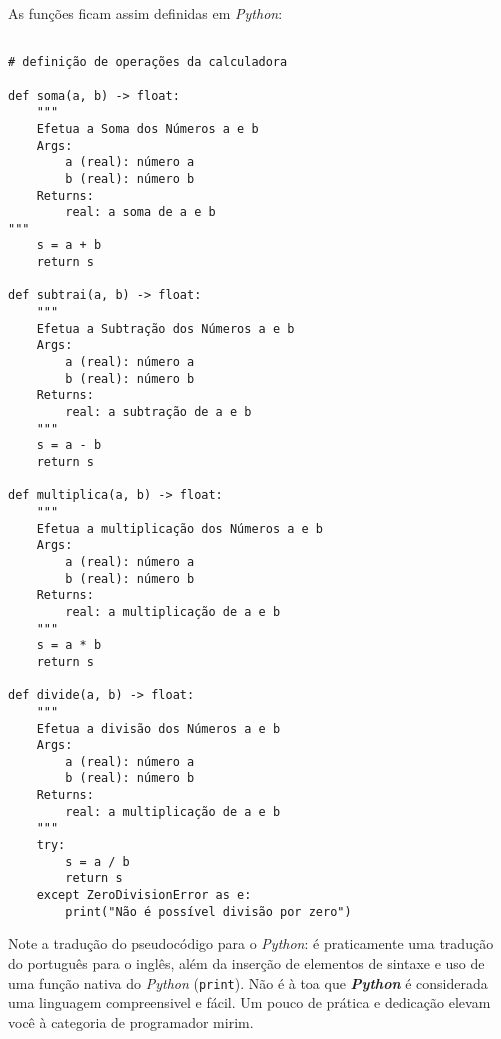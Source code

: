 \documentclass[a4paper, 12pt, onecolumn,singlespacing]{article}
\begin{document}
As funções ficam assim definidas em \textit{Python}:
\begin{verbatim}

# definição de operações da calculadora

def soma(a, b) -> float:
	"""
	Efetua a Soma dos Números a e b
	Args:
		a (real): número a
		b (real): número b
	Returns:
		real: a soma de a e b
"""
	s = a + b
	return s

def subtrai(a, b) -> float:
	"""
	Efetua a Subtração dos Números a e b
	Args:
		a (real): número a
		b (real): número b
	Returns:
		real: a subtração de a e b
	"""
	s = a - b
	return s

def multiplica(a, b) -> float:
	"""
	Efetua a multiplicação dos Números a e b
	Args:
		a (real): número a
		b (real): número b
	Returns:
		real: a multiplicação de a e b
	"""
	s = a * b
	return s

def divide(a, b) -> float:
	"""
	Efetua a divisão dos Números a e b
	Args:
		a (real): número a
		b (real): número b
	Returns:
		real: a multiplicação de a e b
	"""
	try:
		s = a / b
		return s
	except ZeroDivisionError as e:
		print("Não é possível divisão por zero")

\end{verbatim}

Note a tradução do pseudocódigo para o \textit{\textit{Python}}: é praticamente uma tradução do português para o inglês, além da inserção de elementos de sintaxe e uso de uma função nativa do \textit{\textit{Python}} (\texttt{print}). Não é à toa que \textit{\textbf{Python}} é considerada uma linguagem compreensivel e fácil. Um pouco de prática e dedicação elevam você à categoria de programador mirim.
\end{document}
